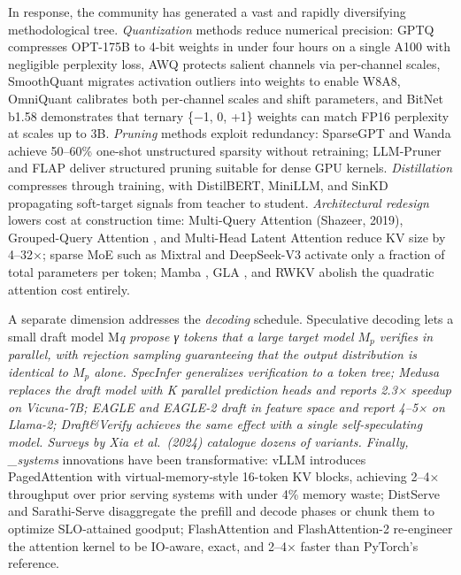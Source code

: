 \documentclass{article}
\begin{document}
In response, the community has generated a vast and rapidly diversifying methodological tree. \emph{Quantization} methods reduce numerical precision: GPTQ \citep{frantar2023gptqaccurateposttr} compresses OPT-175B to 4-bit weights in under four hours on a single A100 with negligible perplexity loss, AWQ \citep{lin20242023} protects salient channels via per-channel scales, SmoothQuant \citep{xiao20232022} migrates activation outliers into weights to enable W8A8, OmniQuant \citep{shao20242023} calibrates both per-channel scales and shift parameters, and BitNet b1.58 \citep{ma20242024} demonstrates that ternary \{−1, 0, +1\} weights can match FP16 perplexity at scales up to 3B. \emph{Pruning} methods exploit redundancy: SparseGPT \citep{frantar2023gptqaccurateposttr} and Wanda \citep{sun2024asimpleandeffectiv} achieve 50--60\% one-shot unstructured sparsity without retraining; LLM-Pruner \citep{ma2023llmpruneronthestru} and FLAP \citep{an20242024} deliver structured pruning suitable for dense GPU kernels. \emph{Distillation} compresses through training, with DistilBERT, MiniLLM, and SinKD \citep{cui20252025} propagating soft-target signals from teacher to student. \emph{Architectural redesign} lowers cost at construction time: Multi-Query Attention (Shazeer, 2019), Grouped-Query Attention \citep{ainslie20232023}, and Multi-Head Latent Attention \citep{liu20242024} reduce KV size by 4--32×; sparse MoE such as Mixtral and DeepSeek-V3 activate only a fraction of total parameters per token; Mamba \citep{gu2024mambalineartimeseq}, GLA \citep{yang20242024}, and RWKV abolish the quadratic attention cost entirely.

A separate dimension addresses the \emph{decoding} schedule. Speculative decoding \citep{leviathan2023fastinferencefromt} lets a small draft model M\emph{q propose γ tokens that a large target model \(M_p\) verifies in parallel, with rejection sampling guaranteeing that the output distribution is identical to \(M_p\) alone. SpecInfer \citep{miao20242024} generalizes verification to a token tree; Medusa \citep{cai20242024} replaces the draft model with K parallel prediction heads and reports 2.3× speedup on Vicuna-7B; EAGLE and EAGLE-2 \citep{li20242024} draft in feature space and report 4--5× on Llama-2; Draft\&Verify \citep{zhang20242024} achieves the same effect with a single self-speculating model. Surveys by Xia et al.~(2024) catalogue dozens of variants. Finally, \_systems} innovations have been transformative: vLLM \citep{kwon20232023} introduces PagedAttention with virtual-memory-style 16-token KV blocks, achieving 2--4× throughput over prior serving systems with under 4\% memory waste; DistServe \citep{zhong20242024} and Sarathi-Serve \citep{agrawal20242024} disaggregate the prefill and decode phases or chunk them to optimize SLO-attained goodput; FlashAttention \citep{dao20222022} and FlashAttention-2 \citep{dao2024flashattention2fas} re-engineer the attention kernel to be IO-aware, exact, and 2--4× faster than PyTorch's reference.
\end{document}
